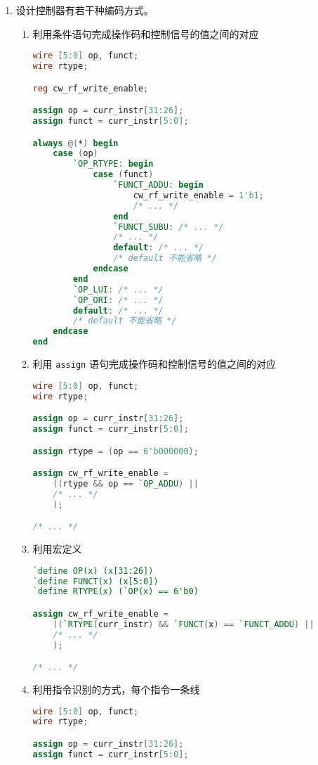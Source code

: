 \documentclass[12pt,AutoFakeBold,AutoFakeSlant]{article}
\begin{document}
\begin{enumerate}
\item 设计控制器有若干种编码方式。
\begin{enumerate}
\item 利用条件语句完成操作码和控制信号的值之间的对应
\begin{lstlisting}[language=Verilog]
wire [5:0] op, funct;
wire rtype;

reg cw_rf_write_enable;

assign op = curr_instr[31:26];
assign funct = curr_instr[5:0];

always @(*) begin
    case (op)
        `OP_RTYPE: begin
            case (funct)
                `FUNCT_ADDU: begin
                    cw_rf_write_enable = 1'b1;
                    /* ... */
                end
                `FUNCT_SUBU: /* ... */
                /* ... */
                default: /* ... */
                /* default 不能省略 */
            endcase
        end
        `OP_LUI: /* ... */
        `OP_ORI: /* ... */
        default: /* ... */
        /* default 不能省略 */
    endcase
end
\end{lstlisting}
\item 利用 \texttt{assign} 语句完成操作码和控制信号的值之间的对应
\begin{lstlisting}[language=Verilog]
wire [5:0] op, funct;
wire rtype;

assign op = curr_instr[31:26];
assign funct = curr_instr[5:0];

assign rtype = (op == 6'b000000);

assign cw_rf_write_enable =
    ((rtype && op == `OP_ADDU) || 
    /* ... */
    );

/* ... */
\end{lstlisting}
\item 利用宏定义
\begin{lstlisting}[language=Verilog]
`define OP(x) (x[31:26])
`define FUNCT(x) (x[5:0])
`define RTYPE(x) (`OP(x) == 6'b0)

assign cw_rf_write_enable = 
    ((`RTYPE(curr_instr) && `FUNCT(x) == `FUNCT_ADDU) ||
    /* ... */
    );

/* ... */
\end{lstlisting}
\item 利用指令识别的方式，每个指令一条线
\begin{lstlisting}[language=Verilog]
wire [5:0] op, funct;
wire rtype;

assign op = curr_instr[31:26];
assign funct = curr_instr[5:0];


\end{lstlisting}
\end{enumerate}
\end{enumerate}
\end{document}
